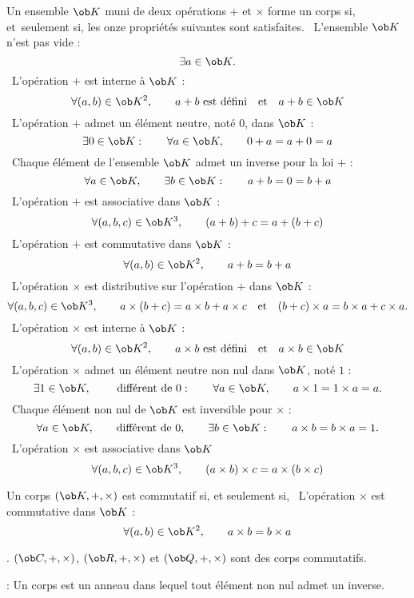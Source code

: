 \Definition Un ensemble $\ob K$ muni de deux op\'erations $+$ et $\times$ 
forme un corps si, et~seulement si, les onze propri\'et\'es suivantes sont satisfaites.
\bigskip
\noindent\qquad{}\ L'ensemble $\ob K$ n'est pas vide : 
$$
\exists a\in \ob K.
$$ 
\noindent\qquad{}\ L'op\'eration $+$ est interne \`a $\ob K$ : 
$$
\forall (a,b)\in \ob K^2, \qquad a+b\mbox{ est d\'efini}\quad\mbox{et}\quad a+b\in \ob K
$$
\noindent\qquad{}\ L'op\'eration $+$ admet un \'el\'ement neutre, not\'e $0$, dans $\ob K$ : 
$$
\exists 0\in \ob K:\qquad \forall a\in \ob K,\qquad 0+a=a+0=a
$$
\noindent\qquad{}\ Chaque \'el\'ement de l'ensemble $\ob K$ admet un inverse pour la loi $+$ : 
$$
\forall a\in \ob K, \qquad \exists b\in \ob K:\qquad a+b=0=b+a
$$
\noindent\qquad{}\ L'op\'eration $+$ est associative dans $\ob K$ :
$$
\forall (a,b,c)\in \ob K^3, \qquad(a+b)+c=a+(b+c)
$$ 
\noindent\qquad{}\ L'op\'eration $+$ est commutative dans $\ob K$ : 
$$
\forall (a,b)\in \ob K^2, \qquad a+b=b+a
$$
\noindent\qquad{}\ L'op\'eration $\times$ est distributive sur l'op\'eration $+$ dans $\ob K$ : 
$$
\forall(a,b,c)\in \ob K^3, \qquad a\times(b+c)=a\times b+a\times c\quad\mbox{et}\quad (b+c)\times a=b\times a+c\times a.
$$ 
\noindent\qquad{}\ L'op\'eration $\times$ est interne \`a $\ob K$ : 
$$
\forall (a,b)\in \ob K^2,\qquad a\times b\mbox{ est d\'efini}\quad \mbox{et}\quad a\times b\in \ob K
$$
\noindent\qquad{}\ L'op\'eration $\times$ admet un \'el\'ement neutre non nul dans $\ob K$, not\'e $1$ :
$$
\exists 1\in \ob K, \qquad\mbox{ diff\'erent de }0: \qquad \forall a\in \ob K, \qquad a\times1=1\times a=a.
$$ 
\noindent\qquad{}\ Chaque \'el\'ement non nul de $\ob K$ est inversible pour $\times$ : 
$$
\forall a\in \ob K, \qquad\mbox{diff\'erent de }0, \qquad \exists b\in \ob K:\qquad a\times b=b\times a=1. 
$$
\noindent\qquad{}\ L'op\'eration $\times$ est associative dans $\ob K$
$$
\forall (a,b,c)\in \ob K^3, \qquad(a\times b)\times c=a\times(b\times c)
$$


\Definition []  Un corps $(\ob K,+,\times)$ est commutatif si, et seulement si, 
\noindent\qquad{}\ L'op\'eration $\times$ est commutative dans $\ob K$ : 
$$
\forall (a,b)\in \ob K^2, \qquad a\times b=b\times a
$$

\Exemples. $(\ob C,+,\times)$, $(\ob R,+,\times)$ et $(\ob Q, +,\times)$ sont des corps commutatifs. 
\bigskip


\Remarque : Un corps est un anneau dans lequel tout \'el\'ement non nul admet un inverse. 
\bigskip

